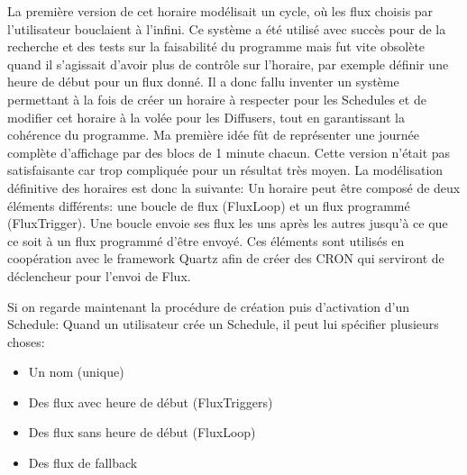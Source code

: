 \documentclass[french]{article}
\begin{document}
La première version de cet horaire modélisait un cycle, où les flux choisis par l'utilisateur bouclaient à l'infini. Ce système a été utilisé avec succès pour de la recherche et des tests sur la faisabilité du programme mais fut vite obsolète quand il s'agissait d'avoir plus de contrôle sur l'horaire, par exemple définir une heure de début pour un flux donné. \newline
Il a donc fallu inventer un système permettant à la fois de créer un horaire à respecter pour les Schedules et de modifier cet horaire à la volée pour les Diffusers, tout en garantissant la cohérence du programme. 
	\newline
Ma première idée fût de représenter une journée complète d'affichage par des blocs de 1 minute chacun. Cette version n'était pas satisfaisante car trop compliquée pour un résultat très moyen. \newline
La modélisation définitive des horaires est donc la suivante: \newline
Un horaire peut être composé de deux éléments différents: une boucle de flux (FluxLoop) et un flux programmé (FluxTrigger). Une boucle envoie ses flux les uns après les autres jusqu'à ce que ce soit à un flux programmé d'être envoyé. Ces éléments sont utilisés en coopération avec le framework Quartz afin de créer des CRON qui serviront de déclencheur pour l'envoi de Flux. 

Si on regarde maintenant la procédure de création puis d'activation d'un Schedule:
Quand un utilisateur crée un Schedule, il peut lui spécifier plusieurs choses:
\begin{itemize}
	\item Un nom (unique)
	\item Des flux avec heure de début (FluxTriggers)
	\item Des flux sans heure de début (FluxLoop)
	\item Des flux de fallback
\end{itemize}
\end{document}
